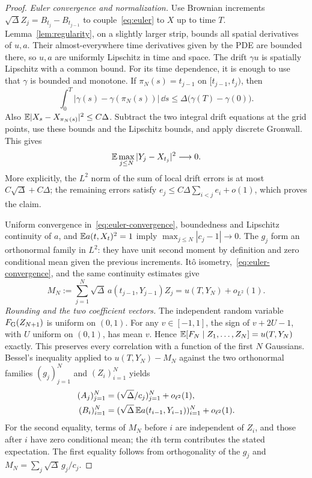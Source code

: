 \begin{proof}
\emph{Euler convergence and normalization.}
Use Brownian increments $\sqrt\Delta Z_j=B_{t_j}-B_{t_{j-1}}$ to
couple~\eqref{eq:euler} to $X$ up to time $T$.
Lemma~\ref{lem:regularity}, on a slightly larger strip, bounds all
spatial derivatives of $u,a$. Their almost-everywhere time derivatives
given by the PDE are bounded there, so $u,a$ are uniformly Lipschitz
in time and space. The drift $\gamma u$ is spatially Lipschitz with
a common bound. For its time dependence, it is enough to use that
$\gamma$ is bounded and monotone.
If $\pi_N(s)=t_{j-1}$ on $[t_{j-1},t_j)$, then
\[
 \int_0^T|\gamma(s)-\gamma(\pi_N(s))|\,\dd s
       \leq\Delta\bigl(\gamma(T)-\gamma(0)\bigr).
\]
Also $\mathbb E|X_s-X_{\pi_N(s)}|^2\leq C\Delta$.
Subtract the two integral drift equations at the grid points, use these
bounds and the Lipschitz bounds, and apply discrete Gronwall. This gives
\begin{equation}\label{eq:euler-convergence}
 \mathbb E\max_{j\leq N}|Y_j-X_{t_j}|^2\longrightarrow0.
\end{equation}
More explicitly, the $L^2$ norm of the sum of local drift errors is at
most $C\sqrt\Delta+C\Delta$; the remaining errors satisfy
$e_j\leq C\Delta\sum_{i<j}e_i+o(1)$, which proves the claim.

Uniform convergence in~\eqref{eq:euler-convergence}, boundedness and
Lipschitz continuity of $a$, and $\mathbb E a(t,X_t)^2=1$ imply
$\max_{j\leq N}|c_j-1|\to0$.
The $g_j$ form an orthonormal family in $L^2$: they have unit second
moment by definition and zero conditional mean given the previous
increments. It\^o isometry,~\eqref{eq:euler-convergence}, and the
same continuity estimates give
\[
 M_N:=\sum_{j=1}^N\sqrt\Delta\,a(t_{j-1},Y_{j-1})Z_j
      =u(T,Y_N)+o_{L^2}(1).
\]
\emph{Rounding and the two coefficient vectors.}
The independent random variable $F_{\rm G}(Z_{N+1})$ is uniform on
$(0,1)$. For any $v\in[-1,1]$, the sign of $v+2U-1$, with $U$
uniform on $(0,1)$, has mean $v$. Hence
$\mathbb E[F_N\mid Z_1,\ldots,Z_N]=u(T,Y_N)$ exactly.
This preserves every correlation with a function of the first $N$
Gaussians. Bessel's inequality applied to $u(T,Y_N)-M_N$ against the two
orthonormal families $(g_j)_{j=1}^N$ and $(Z_i)_{i=1}^N$ yields
\begin{align*}
 (A_j)_{j=1}^N&=(\sqrt\Delta/c_j)_{j=1}^N+o_{\ell^2}(1),\\
 (B_i)_{i=1}^N&=(\sqrt\Delta\,\mathbb E a(t_{i-1},Y_{i-1}))_{i=1}^N
                                      +o_{\ell^2}(1).
\end{align*}
For the second equality, terms of $M_N$ before $i$ are independent of
$Z_i$, and those after $i$ have zero conditional mean; the $i$th term
contributes the stated expectation. The first equality follows from
orthogonality of the $g_j$ and $M_N=\sum_j\sqrt\Delta\,g_j/c_j$.


\end{proof}
